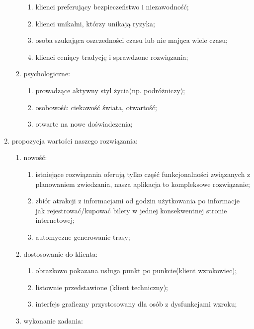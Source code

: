\begin{enumerate}[label=\Roman*.]
\begin{enumerate}[label=\alph*.]
\begin{enumerate}[label=\roman*.]
            \item klienci preferujący bezpieczeństwo i niezawodność;
            \item klienci unikalni, którzy unikają ryzyka;
            \item osoba szukająca oszczedności czasu lub nie mająca wiele czasu;
            \item klienci ceniący tradycję i sprawdzone rozwiązania;
        \end{enumerate}
        \item psychologiczne:
        \begin{enumerate}[label=\roman*.]
            \item prowadzące aktywny styl życia(np. podróżniczy);
            \item osobowość: ciekawość świata, otwartość;
            \item otwarte na nowe doświadczenia;
        \end{enumerate}
    \end{enumerate}
    \item propozycja wartości naszego rozwiązania:
    \begin{enumerate}[label=\alph*.]
        \item nowość:
        \begin{enumerate}[label=\roman*.]
            \item istniejące rozwiązania oferują tylko część funkcjonalności związanych z planowaniem zwiedzania, nasza aplikacja to kompleksowe rozwiązanie;
            \item zbiór atrakcji z informacjami od godzin użytkowania po informacje jak rejestrować/kupować bilety w jednej konsekwentnej stronie internetowej;
            \item automyczne generowanie trasy;
        \end{enumerate}
        \item dostosowanie do klienta:
        \begin{enumerate}[label=\roman*.]
            \item obrazkowo pokazana usługa punkt po punkcie(klient wzrokowiec);
            \item listownie przedstawione  (klient techniczny);
            \item interfejs graficzny przystosowany dla osób z dysfunkcjami wzroku;
        \end{enumerate}
        \item wykonanie zadania:

\end{enumerate}
\end{enumerate}
